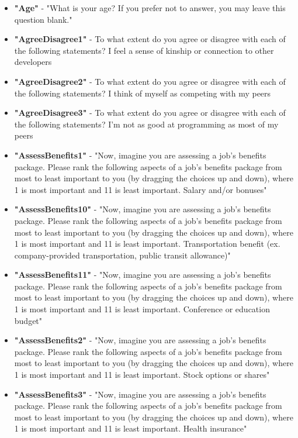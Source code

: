 \begin{appendices}
    \begin{itemize}
        \item \textbf{"Age"} - "What is your age? If you prefer not to answer, you may leave this question blank."
        \item \textbf{"AgreeDisagree1"} - To what extent do you agree or disagree with each of the following statements? I feel a sense of kinship or connection to other developers
        \item \textbf{"AgreeDisagree2"} - To what extent do you agree or disagree with each of the following statements? I think of myself as competing with my peers
        \item \textbf{"AgreeDisagree3"} - To what extent do you agree or disagree with each of the following statements? I'm not as good at programming as most of my peers
        \item \textbf{"AssessBenefits1"} - "Now, imagine you are assessing a job's benefits package. Please rank the following aspects of a job's benefits package from most to least important to you (by dragging the choices up and down), where 1 is most important and 11 is least important. Salary and/or bonuses"
        \item \textbf{"AssessBenefits10"} - "Now, imagine you are assessing a job's benefits package. Please rank the following aspects of a job's benefits package from most to least important to you (by dragging the choices up and down), where 1 is most important and 11 is least important. Transportation benefit (ex. company-provided transportation, public transit allowance)"
        \item \textbf{"AssessBenefits11"} - "Now, imagine you are assessing a job's benefits package. Please rank the following aspects of a job's benefits package from most to least important to you (by dragging the choices up and down), where 1 is most important and 11 is least important. Conference or education budget"
        \item \textbf{"AssessBenefits2"} - "Now, imagine you are assessing a job's benefits package. Please rank the following aspects of a job's benefits package from most to least important to you (by dragging the choices up and down), where 1 is most important and 11 is least important. Stock options or shares"
        \item \textbf{"AssessBenefits3"} - "Now, imagine you are assessing a job's benefits package. Please rank the following aspects of a job's benefits package from most to least important to you (by dragging the choices up and down), where 1 is most important and 11 is least important. Health insurance"

\end{itemize}
\end{appendices}
